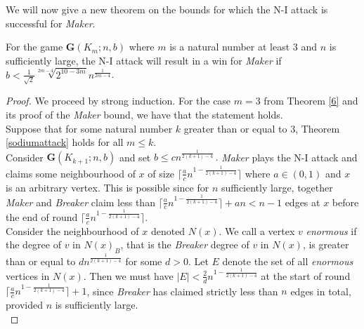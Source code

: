 \documentclass[a4paper,oneside,11pt]{report}
\begin{document}
We will now give a new theorem on the bounds for which the N-I attack is successful for \textit{Maker}.

\begin{theorem}\label{sodiumattack}

    For the game $\textbf{G}(K_m;n,b)$ where $m$ is a natural number at least 3 and $n$ is sufficiently large, the N-I attack will result in a win for \textit{Maker} if $b < \frac{1}{\sqrt{2}}\sqrt[2m-4]{2^{10-3m}}n^{\frac{1}{2m-4}}$.
    
\end{theorem}

    \begin{proof}
    
         We proceed by strong induction. For the case $m=3$ from Theorem \ref{6} and its proof of the \textit{Maker} bound, we have that the statement holds.\\

         Suppose that for some natural number $k$ greater than or equal to 3, Theorem \ref{sodiumattack} holds for all $m \leqslant k$.\\

     Consider $\textbf{G}(K_{k+1};n,b)$ and set $b \leqslant cn^{\frac{1}{2(k+1)-4}}\,.$ \textit{Maker} plays the N-I attack and claims some neighbourhood of $x$ of size $\lceil \frac{a}{c}n^{1-\frac{1}{2(k+1)-4}} \rceil$ where $a \in (0,1)$ and $x$ is an arbitrary vertex. This is possible since for $n$ sufficiently large, together \textit{Maker} and \textit{Breaker} claim less than $\lceil \frac{a}{c}n^{1-\frac{1}{2(k+1)-4}} \rceil + an < n-1$ edges at $x$ before the end of round $\lceil \frac{a}{c}n^{1-\frac{1}{2(k+1)-4}} \rceil$.\\

         Consider the neighbourhood of $x$ denoted $N(x)$. We call a vertex $v$ \textit{enormous} if the degree of $v$ in $N(x)_B$, that is the \textit{Breaker} degree of $v$ in $N(x)$, is greater than or equal to $dn^{\frac{1}{2(k+1)-4}}$ for some $d > 0$. Let $E$ denote the set of all \textit{enormous} vertices in $N(x)$. Then we must have $\lvert E \rvert < \frac{2}{d}n^{1-\frac{1}{2(k+1)-4}}$ at the start of round  $\lceil \frac{a}{c}n^{1-\frac{1}{2(k+1)-4}} \rceil+1$,  since \textit{Breaker} has claimed strictly less than $n$ edges in total, provided $n$ is sufficiently large.\\


\end{proof}
\end{document}
